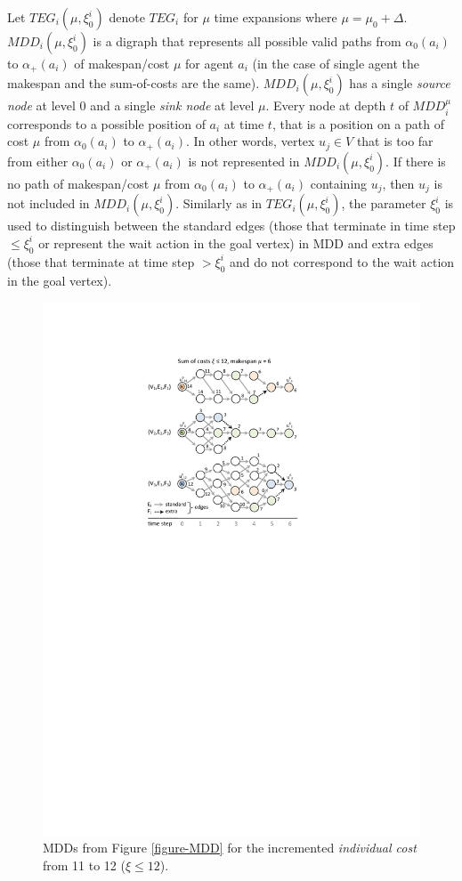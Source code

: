 \documentclass[jair,oneside,11pt]{article}
\begin{document}
Let $TEG_{i}(\mu,\xi^i_0)$ denote $TEG_i$ for $\mu$ time expansions where $\mu=\mu_0+\Delta$. $MDD_i(\mu,\xi^i_0)$ is a digraph that represents all possible valid paths from $\alpha_0(a_i)$ to $\alpha_+(a_i)$ of makespan/cost $\mu$ for agent $a_i$ (in the case of single agent the makespan and the sum-of-costs are the same). $MDD_i(\mu,\xi^i_0)$ has a single {\em source node} at level 0 and a single {\em sink node} at level $\mu$. Every node at depth $t$ of $MDD_i^\mu$ corresponds to a possible position of $a_i$ at time $t$, that is a position on a path of cost $\mu$ from $\alpha_0(a_i)$ to $\alpha_+(a_i)$. In other words, vertex $u_j \in V$ that is too far from either $\alpha_0(a_i)$ or $\alpha_+(a_i)$ is not represented in $MDD_i(\mu,\xi^i_0)$. If there is no path of makespan/cost $\mu$ from $\alpha_0(a_i)$ to $\alpha_+(a_i)$ containing $u_j$, then $u_j$ is not included in $MDD_i(\mu,\xi^i_0)$. Similarly as in $TEG_i(\mu,\xi^i_0)$, the parameter $\xi^i_0$ is used to distinguish between the standard edges (those that terminate in time step $\leq \xi^i_0$ or represent the wait action in the goal vertex) in MDD and extra edges (those that terminate at time step $> \xi^i_0$ and do not correspond to the wait action in the goal vertex).

\begin{figure}[h]
\centering
\includegraphics[trim={3.5cm 17.2cm 3.5cm 3.1cm},clip,width=1.0\textwidth]{fig_MDDplus.pdf}
\caption{MDDs from Figure \ref{figure-MDD} for the incremented \textit{individual cost} from 11 to 12 ($\xi\leq 12$).}
\label{figure-MDDplus}
\end{figure}
\end{document}
